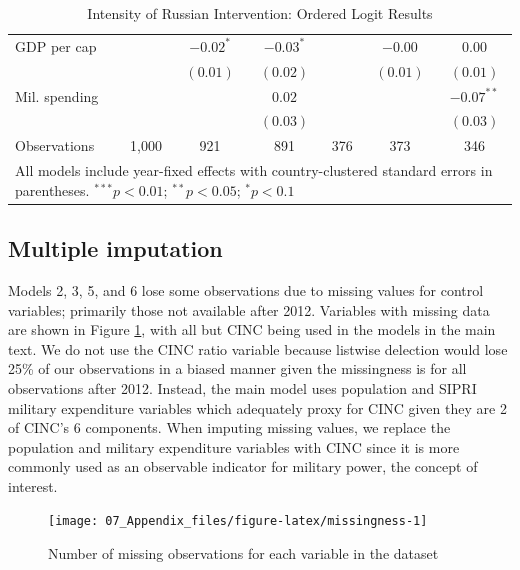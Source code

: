 \documentclass[
]{article}
\begin{document}
\begin{table}[h!]
\begin{center}
\begin{tabular}{l c c c c c c}
\quad GDP per cap     &              & $-0.02^{*}$   & $-0.03^{*}$   &          & $-0.00$      & $0.00$        \\
                      &              & $(0.01)$      & $(0.02)$      &          & $(0.01)$     & $(0.01)$      \\
\quad Mil. spending   &              &               & $0.02$        &          &              & $-0.07^{**}$  \\
                      &              &               & $(0.03)$      &          &              & $(0.03)$      \\
\hline
Observations          & 1,000        & 921           & 891           & 376      & 373          & 346           \\
\hline
\multicolumn{7}{l}{\scriptsize{All models include year-fixed effects with country-clustered standard errors in parentheses. $^{***}p<0.01$; $^{**}p<0.05$; $^{*}p<0.1$}}
\end{tabular}
\caption{Intensity of Russian Intervention: Ordered Logit Results}
\label{tab:ordered-logit-results}
\end{center}
\end{table}

\hypertarget{multiple-imputation}{%
\subsection{Multiple imputation}\label{multiple-imputation}}

Models 2, 3, 5, and 6 lose some observations due to missing values for control variables; primarily those not available after 2012. Variables with missing data are shown in Figure \ref{fig:missingness}, with all but CINC being used in the models in the main text. We do not use the CINC ratio variable because listwise delection would lose 25\% of our observations in a biased manner given the missingness is for all observations after 2012. Instead, the main model uses population and SIPRI military expenditure variables which adequately proxy for CINC given they are 2 of CINC's 6 components. When imputing missing values, we replace the population and military expenditure variables with CINC since it is more commonly used as an observable indicator for military power, the concept of interest.

\begin{figure}[h!]

{\centering \texttt{[image: 07\_Appendix\_files/figure-latex/missingness-1]} 

}

\caption{Number of missing observations for each variable in the dataset}\label{fig:missingness}
\end{figure}
\end{document}
